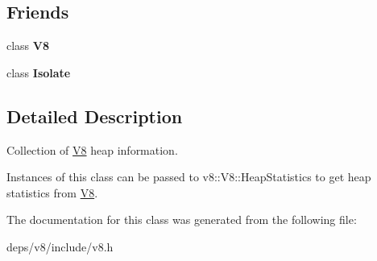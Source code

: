 \subsection*{Friends}
\begin{DoxyCompactItemize}
\item 
\hypertarget{classv8_1_1_heap_statistics_a51a1fbf409294cf02a99a020ac94a763}{}class {\bfseries V8}\label{classv8_1_1_heap_statistics_a51a1fbf409294cf02a99a020ac94a763}

\item 
\hypertarget{classv8_1_1_heap_statistics_aba4f0964bdacf2bbf62cf876e5d28d0a}{}class {\bfseries Isolate}\label{classv8_1_1_heap_statistics_aba4f0964bdacf2bbf62cf876e5d28d0a}

\end{DoxyCompactItemize}


\subsection{Detailed Description}
Collection of \hyperlink{classv8_1_1_v8}{V8} heap information.

Instances of this class can be passed to v8\+::\+V8\+::\+Heap\+Statistics to get heap statistics from \hyperlink{classv8_1_1_v8}{V8}. 

The documentation for this class was generated from the following file\+:\begin{DoxyCompactItemize}
\item 
deps/v8/include/v8.\+h\end{DoxyCompactItemize}
